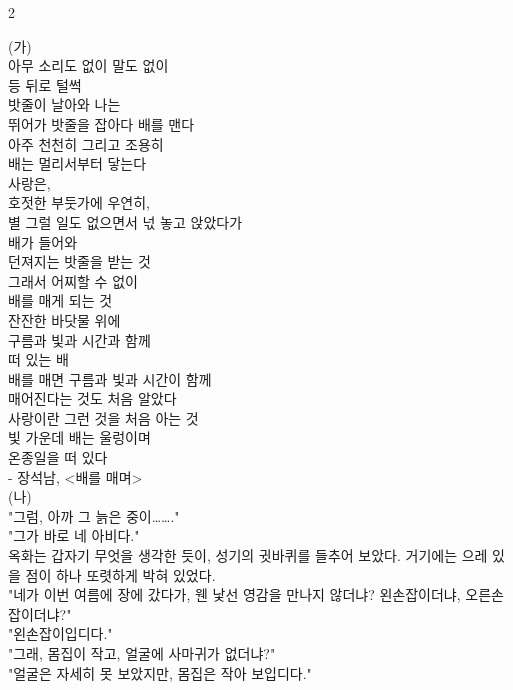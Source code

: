 \documentclass[10pt, a4paper]{article}
\begin{document}
\begin{multicols}{2}


\vspace{1mm}
\vspace{0.5mm}

\begin{passagebox}
\noindent{}(가) \\
아무 소리도 없이 말도 없이 \\
등 뒤로 털썩 \\
밧줄이 날아와 나는 \\
뛰어가 밧줄을 잡아다 배를 맨다 \\
아주 천천히 그리고 조용히 \\
배는 멀리서부터 닿는다
\\[0.5em]
사랑은, \\
호젓한 부둣가에 우연히, \\
별 그럴 일도 없으면서 넋 놓고 앉았다가 \\
배가 들어와 \\
던져지는 밧줄을 받는 것 \\
그래서 어찌할 수 없이 \\
배를 매게 되는 것
\\[0.5em]
잔잔한 바닷물 위에 \\
구름과 빛과 시간과 함께 \\
떠 있는 배
\\[0.5em]
배를 매면 구름과 빛과 시간이 함께 \\
매어진다는 것도 처음 알았다 \\
사랑이란 그런 것을 처음 아는 것
\\[0.5em]
빛 가운데 배는 울렁이며 \\
온종일을 떠 있다
\\[0.5em]
- 장석남, <배를 매며>
\\[0.5em]
(나) \\
"그럼, 아까 그 늙은 중이……." \\
"그가 바로 네 아비다." \\
옥화는 갑자기 무엇을 생각한 듯이, 성기의 귓바퀴를 들추어 보았다. 거기에는 으레 있을 점이 하나 또렷하게 박혀 있었다. \\
"네가 이번 여름에 장에 갔다가, 웬 낯선 영감을 만나지 않더냐? 왼손잡이더냐, 오른손잡이더냐?" \\
"왼손잡이입디다." \\
"그래, 몸집이 작고, 얼굴에 사마귀가 없더냐?" \\
"얼굴은 자세히 못 보았지만, 몸집은 작아 보입디다." \\

\end{passagebox}
\end{multicols}
\end{document}
